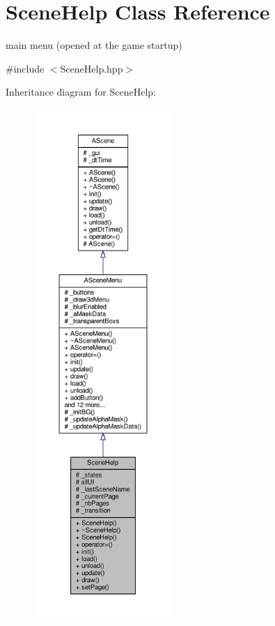 \hypertarget{class_scene_help}{}\section{Scene\+Help Class Reference}
\label{class_scene_help}


main menu (opened at the game startup)  




{\ttfamily \#include $<$Scene\+Help.\+hpp$>$}



Inheritance diagram for Scene\+Help\+:
\nopagebreak
\begin{figure}[H]
\begin{center}
\leavevmode
\includegraphics[height=550pt]{class_scene_help__inherit__graph}
\end{center}
\end{figure}


